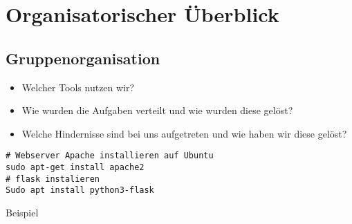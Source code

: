 \section{Organisatorischer Überblick}

\subsection{Gruppenorganisation}

\begin{itemize}
    \item Welcher Tools nutzen wir?
    \item Wie wurden die Aufgaben verteilt und wie wurden diese gelöst?
    \item Welche Hindernisse sind bei uns aufgetreten und wie haben wir diese gelöst?
\end{itemize}

\begin{verbatim}
# Webserver Apache installieren auf Ubuntu
sudo apt-get install apache2
# flask instalieren
Sudo apt install python3-flask

\end{verbatim}

\begin{listing}[ht]{}
    \caption{Beispiel}
    \label{listing:Beispiel}
\end{listing}
